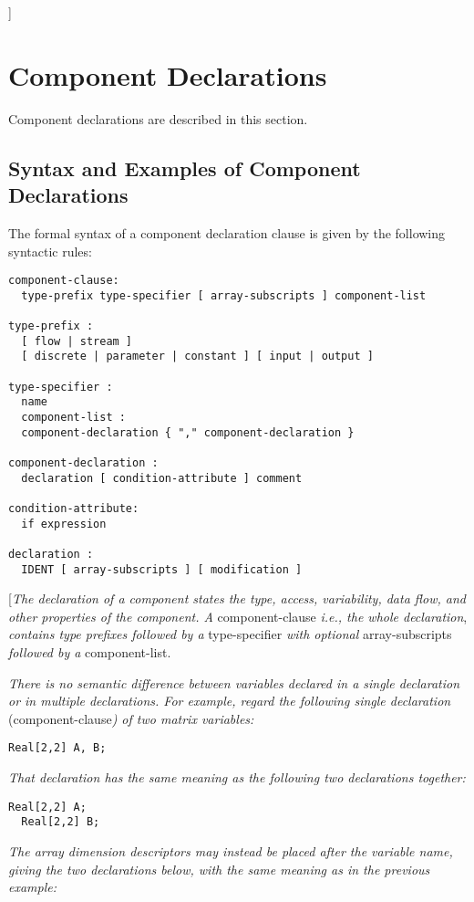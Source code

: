 {]}

\section{Component Declarations}

Component declarations are described in this section.

\subsection{Syntax and Examples of Component Declarations}

The formal syntax of a component declaration clause is given by the
following syntactic rules:

\begin{lstlisting}[language=grammar]
component-clause:
  type-prefix type-specifier [ array-subscripts ] component-list

type-prefix :
  [ flow | stream ]
  [ discrete | parameter | constant ] [ input | output ]

type-specifier :
  name
  component-list :
  component-declaration { "," component-declaration }

component-declaration :
  declaration [ condition-attribute ] comment

condition-attribute:
  if expression

declaration :
  IDENT [ array-subscripts ] [ modification ]
\end{lstlisting}

{[}\emph{The declaration of a component states the type, access,
variability, data flow, and other properties of the component. A}
component-clause \emph{i.e., the whole declaration}, \emph{contains type
prefixes followed by a} type-specifier \emph{with optional}
array-subscripts \emph{followed by a} component-list.

\emph{There is no semantic difference between variables declared in a
single declaration or in multiple declarations. For example, regard the
following single declaration} (component-clause\emph{) of two matrix
variables:}

\begin{lstlisting}[language=modelica]
  Real[2,2] A, B;
\end{lstlisting}
\emph{That declaration has the same meaning as the following two
declarations together:}

\begin{lstlisting}[language=modelica]
  Real[2,2] A;
  Real[2,2] B;
\end{lstlisting}
\emph{The array dimension descriptors may instead be placed after the
variable name, giving the two declarations below, with the same meaning
as in the previous example:}

